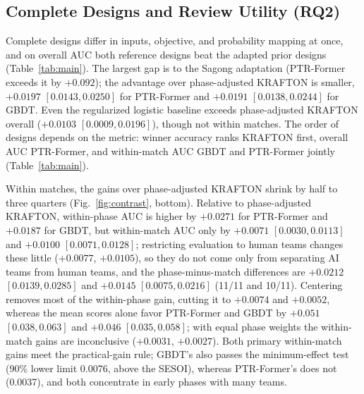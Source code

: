 \documentclass[sigconf,anonymous]{acmart}
\begin{document}
\subsection{Complete Designs and Review Utility (RQ2)}
\label{sec:results:designs}

Complete designs differ in inputs, objective, and probability mapping at once, and on overall AUC both reference designs beat the adapted prior designs (Table~\ref{tab:main}). The largest gap is to the Sagong adaptation (PTR-Former exceeds it by $+0.092$); the advantage over phase-adjusted KRAFTON is smaller, $+0.0197$ $[0.0143,\allowbreak 0.0250]$ for PTR-Former and $+0.0191$ $[0.0138,\allowbreak 0.0244]$ for GBDT. Even the regularized logistic baseline exceeds phase-adjusted KRAFTON overall ($+0.0103$ $[0.0009,\allowbreak 0.0196]$), though not within matches. The order of designs depends on the metric: winner accuracy ranks KRAFTON first, overall AUC PTR-Former, and within-match AUC GBDT and PTR-Former jointly (Table~\ref{tab:main}).

Within matches, the gains over phase-adjusted KRAFTON shrink by half to three quarters (Fig.~\ref{fig:contrast}, bottom). Relative to phase-adjusted KRAFTON, within-phase AUC is higher by $+0.0271$ for PTR-Former and $+0.0187$ for GBDT, but within-match AUC only by $+0.0071$ $[0.0030,\allowbreak 0.0113]$ and $+0.0100$ $[0.0071,\allowbreak 0.0128]$; restricting evaluation to human teams changes these little ($+0.0077$, $+0.0105$), so they do not come only from separating AI teams from human teams, and the phase-minus-match differences are $+0.0212$ $[0.0139,\allowbreak 0.0285]$ and $+0.0145$ $[0.0075,\allowbreak 0.0216]$ (11/11 and 10/11). Centering removes most of the within-phase gain, cutting it to $+0.0074$ and $+0.0052$, whereas the mean scores alone favor PTR-Former and GBDT by $+0.051$ $[0.038,\allowbreak 0.063]$ and $+0.046$ $[0.035,\allowbreak 0.058]$; with equal phase weights the within-match gains are inconclusive ($+0.0031$, $+0.0027$). Both primary within-match gains meet the practical-gain rule; GBDT's also passes the minimum-effect test (90\% lower limit 0.0076, above the SESOI), whereas PTR-Former's does not (0.0037), and both concentrate in early phases with many teams.
\end{document}
